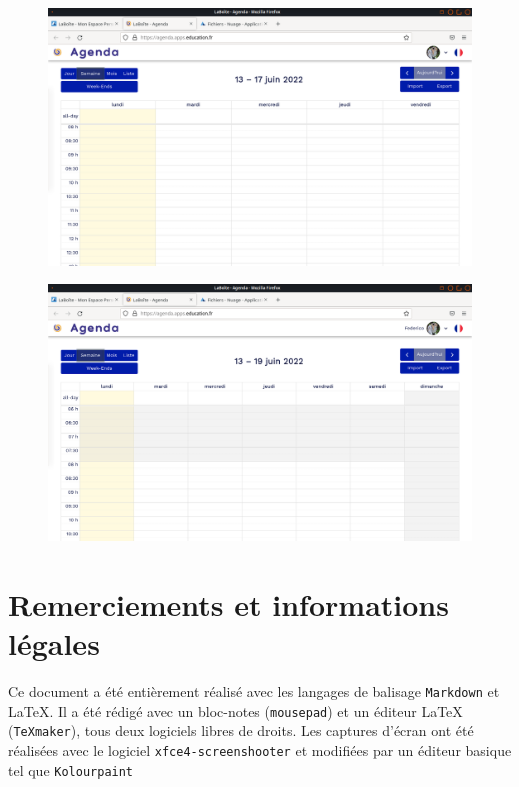 \documentclass[a4paper, 11pt]{book}
\renewcommand{\baselinestretch}{1.25}
\begin{document}
\begin{figure}
    \centering
    \includegraphics{Captures/agenda.semaine.png}
\end{figure}

\begin{figure}
    \centering
    \includegraphics{Captures/agenda.semaine.we.png}
\end{figure}




\chapter*{Remerciements et informations légales}

Ce document a été entièrement réalisé avec les langages de balisage \texttt{Markdown} et \LaTeX{}. 
Il a été rédigé avec un bloc-notes (\texttt{mousepad}) et un éditeur \LaTeX{} (\texttt{\TeX{}maker}), tous deux logiciels libres de droits.
Les captures d'écran ont été réalisées avec le logiciel \texttt{xfce4-screenshooter} et modifiées par un éditeur basique tel que \texttt{Kolourpaint}

\newpage
\renewcommand{\baselinestretch}{1}
\setlength{\parskip}{0em}
\tableofcontents
\end{document}

